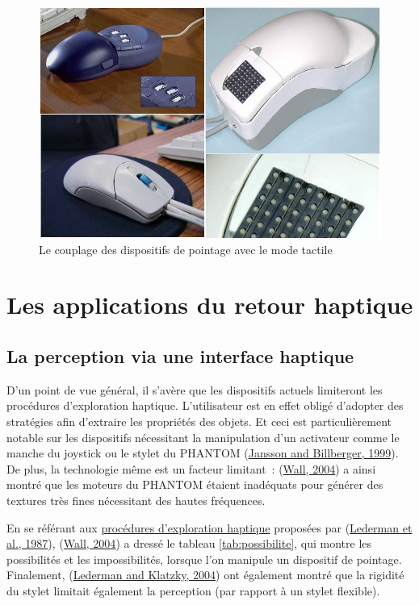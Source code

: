 \documentclass[
]{book}
\begin{document}
\begin{figure}
\centering
\includegraphics{img/sourisTactile.jpg}
\caption{\label{fig:couplage}Le couplage des dispositifs de pointage avec le mode
tactile}
\end{figure}

\hypertarget{les-applications-du-retour-haptique}{%
\section{Les applications du retour haptique}\label{les-applications-du-retour-haptique}}

\hypertarget{perception}{%
\subsection{La perception via une interface haptique}\label{perception}}

D'un point de vue général, il s'avère que les dispositifs actuels
limiteront les procédures d'exploration haptique. L'utilisateur est en effet
obligé d'adopter des stratégies afin d'extraire les propriétés des objets. Et
ceci est particulièrement notable sur les dispositifs nécessitant la
manipulation d'un activateur comme le manche du joystick ou le stylet du
PHANTOM (\protect\hyperlink{ref-jansson1999phantom}{Jansson and Billberger, 1999}). De plus, la technologie même est un facteur
limitant~: (\protect\hyperlink{ref-wall2004investigation}{Wall, 2004}) a ainsi montré que les moteurs du
PHANTOM étaient inadéquats pour générer des textures très fines nécessitant
des hautes fréquences.

En se référant aux \protect\hyperlink{conjuguent}{procédures d'exploration haptique} proposées
par (\protect\hyperlink{ref-lederman1987haptic}{Lederman et al., 1987}), (\protect\hyperlink{ref-wall2004investigation}{Wall, 2004}) a dressé le
tableau \ref{tab:possibilite}, qui montre les possibilités et les
impossibilités, lorsque l'on manipule un dispositif de pointage. Finalement,
(\protect\hyperlink{ref-lederman2004haptic}{Lederman and Klatzky, 2004}) ont également montré que la rigidité du stylet limitait
également la perception (par rapport à un stylet flexible).
\end{document}
